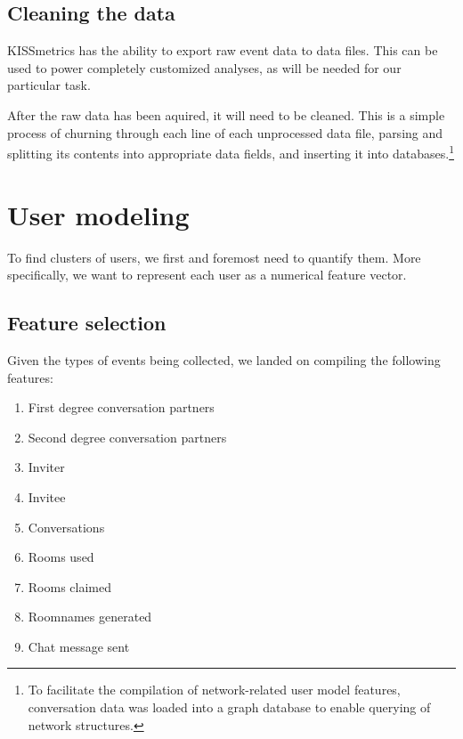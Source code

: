 
\subsection{Cleaning the data}
\label{approach:sec:cleaning_data}

KISSmetrics has the ability to export raw event data to data files. This can be used to power completely customized analyses, as will be needed for our particular task.

After the raw data has been aquired, it will need to be cleaned. This is a simple process of churning through each line of each unprocessed data file, parsing and splitting its contents into appropriate data fields, and inserting it into databases.\footnote{To facilitate the compilation of network-related user model features, conversation data was loaded into a graph database to enable querying of network structures.}


\section{User modeling} %
\label{approach:sec:user_modeling}

To find clusters of users, we first and foremost need to quantify them. More specifically, we want to represent each user as a numerical feature vector.

\subsection{Feature selection}
\label{approach:sec:feature_selection}

Given the types of events being collected, we landed on compiling the following features:

\begin{enumerate}
  \item First degree conversation partners
  \item Second degree conversation partners
  \item Inviter
  \item Invitee
  \item Conversations
  \item Rooms used
  \item Rooms claimed
  \item Roomnames generated
  \item Chat message sent
\end{enumerate}

